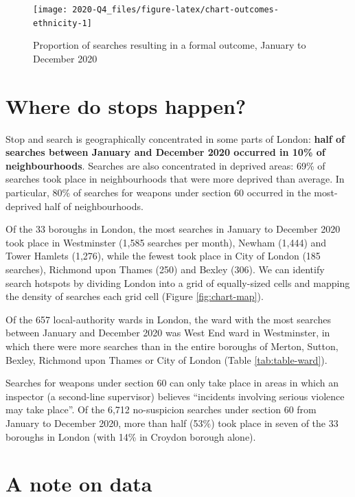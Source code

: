 \documentclass[
  a4paper,
  twoside, 11pt]{article}
\begin{document}
\begin{figure}[tb]

{\centering \texttt{[image: 2020-Q4\_files/figure-latex/chart-outcomes-ethnicity-1]} 

}

\caption{Proportion of searches resulting in a formal outcome, January to December 2020}\label{fig:chart-outcomes-ethnicity}
\end{figure}

\hypertarget{where-do-stops-happen}{%
\section{Where do stops happen?}\label{where-do-stops-happen}}

Stop and search is geographically concentrated in some parts of London: \textbf{half of searches between January and December 2020 occurred in 10\% of neighbourhoods}. Searches are also concentrated in deprived areas: 69\% of searches took place in neighbourhoods that were more deprived than average. In particular, 80\% of searches for weapons under section 60 occurred in the most-deprived half of neighbourhoods.

Of the 33 boroughs in London, the most searches in January to December 2020 took place in Westminster (1,585 searches per month), Newham (1,444) and Tower Hamlets (1,276), while the fewest took place in City of London (185 searches), Richmond upon Thames (250) and Bexley (306). We can identify search hotspots by dividing London into a grid of equally-sized cells and mapping the density of searches each grid cell (Figure \ref{fig:chart-map}).

Of the 657 local-authority wards in London, the ward with the most searches between January and December 2020 was West End ward in Westminster, in which there were more searches than in the entire boroughs of Merton, Sutton, Bexley, Richmond upon Thames or City of London (Table \ref{tab:table-ward}).

Searches for weapons under section 60 can only take place in areas in which an inspector (a second-line supervisor) believes ``incidents involving serious violence may take place''. Of the 6,712 no-suspicion searches under section 60 from January to December 2020, more than half (53\%) took place in seven of the 33 boroughs in London (with 14\% in Croydon borough alone).

\hypertarget{a-note-on-data}{%
\section{A note on data}\label{a-note-on-data}}
\end{document}
